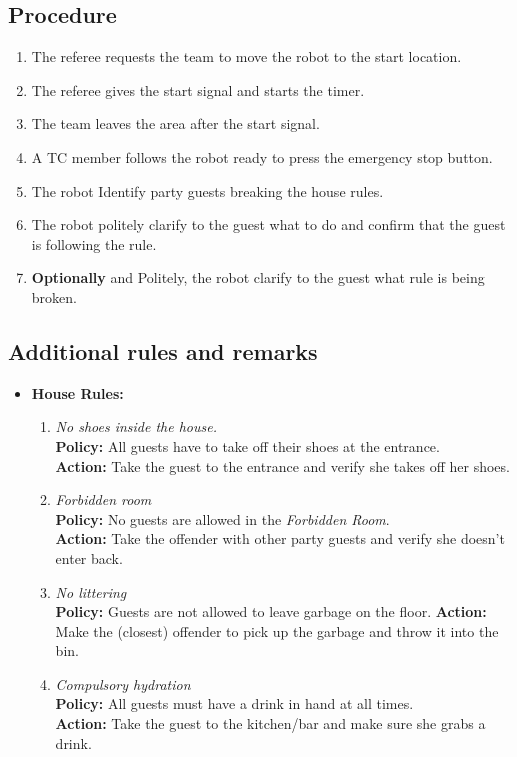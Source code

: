 \subsection*{Procedure}
	\begin{enumerate}[nosep]
		\item The referee requests the team to move the robot to the start location.
		\item The referee gives the start signal and starts the timer.
		\item The team leaves the area after the start signal.		
		\item A TC member follows the robot ready to press the emergency stop button.
		\item The robot Identify party guests breaking the house rules.
		\item The robot politely clarify to the guest what to do and confirm that the guest is following the rule.	
		\item \textbf{Optionally} and Politely, the robot clarify to the guest what rule is being broken.
	\end{enumerate}


\subsection*{Additional rules and remarks}
\begin{itemize}[nosep]
	\item \textbf{House Rules:}
	\begin{enumerate}[nosep]
		\item \textit{No shoes inside the house.}\\
		\textbf{Policy:} All guests have to take off their shoes at the entrance.\\
		\textbf{Action:} Take the guest to the entrance and verify she takes off her shoes.
	
		\item \textit{Forbidden room}\\
		\textbf{Policy:} No guests are allowed in the \emph{Forbidden Room}. \\
		\textbf{Action:} Take the offender with other party guests and verify she doesn't enter back.
	
		\item \textit{No littering}\\
		\textbf{Policy:} Guests are not allowed to leave garbage on the floor.
		\textbf{Action:} Make the (closest) offender to pick up the garbage and throw it into the bin.
	
		\item \textit{Compulsory hydration}\\
		\textbf{Policy:} All guests must have a drink in hand at all times.\\
		\textbf{Action:} Take the guest to the kitchen/bar and make sure she grabs a drink.
	\end{enumerate}
\end{itemize}

